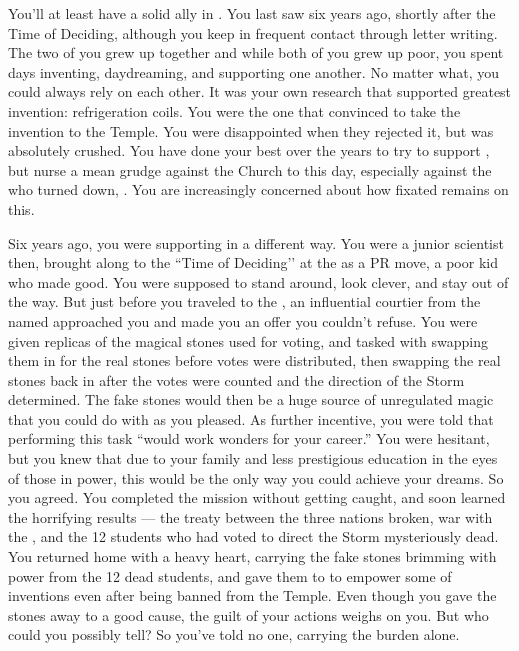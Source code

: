 \documentclass[char]{GL2020}
\begin{document}
You'll at least have a solid ally in \cChupInventor{\full}. You last saw \cChupInventor{\them} six years ago, shortly after the Time of Deciding, although you keep in frequent contact through letter writing. The two of you grew up together and while both of you grew up poor, you spent days inventing, daydreaming, and supporting one another. No matter what, you could always rely on each other. It was your own research that supported \cChupInventor{\their} greatest invention: refrigeration coils. You were the one that convinced \cChupInventor{} to take the invention to the Temple. You were disappointed when they rejected it, but \cChupInventor{} was absolutely crushed. You have done your best over the years to try to support \cChupInventor{}, but \cChupInventor{\they} nurse\cChupInventor{\verbs} a mean grudge against the Church to this day, especially against the \cAntiChup{\cleric} who turned \cChupInventor{\them} down, \cAntiChup{\full}. You are increasingly concerned about how fixated \cChupInventor{} remains on this.

Six years ago, you were supporting \cChupInventor{} in a different way. You were a junior scientist then, brought along to the ``Time of Deciding’’ at the \pSchool{} as a PR move, a poor kid who made good. You were supposed to stand around, look clever, and stay out of the way. But just before you traveled to the \pSc{}, an influential courtier from the \pFarm{} named \cEvil{\full} approached you and made you an offer you couldn't refuse. You were given replicas of the magical stones used for voting, and tasked with swapping them in for the real stones before votes were distributed, then swapping the real stones back in after the votes were counted and the direction of the Storm determined. The fake stones would then be a huge source of unregulated magic that you could do with as you pleased. As further incentive, you were told that performing this task ``would work wonders for your career.'' You were hesitant, but you knew that due to your family and less prestigious education in the eyes of those in power, this would be the only way you could achieve your dreams. So you agreed. You completed the mission without getting caught, and soon learned the horrifying results — the treaty between the three nations broken, war with the \pShip{}, and the 12 students who had voted to direct the Storm mysteriously dead. You returned home with a heavy heart, carrying the fake stones brimming with power from the 12 dead students, and gave them to \cChupInventor{} to empower some of \cChupInventor{\their} inventions even after being banned from the Temple. Even though you gave the stones away to a good cause, the guilt of your actions weighs on you. But who could you possibly tell? So you've told no one, carrying the burden alone.
\end{document}
